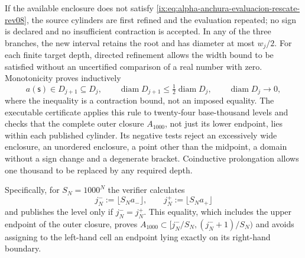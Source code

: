 If the available enclosure does not satisfy
\eqref{ix:eq:alpha-anchura-evaluacion-rescate-rev08}, the source cylinders are first
refined and the evaluation repeated; no sign is declared and no
insufficient contraction is accepted. In any of the three branches, the new
interval retains the root and has diameter at most \(w_j/2\). For each
finite target depth, directed refinement allows the width bound to be
satisfied without an uncertified comparison of a real number with zero.
Monotonicity proves inductively
\begin{equation}
 a(\mathsf s)\in D_{j+1}\subseteq D_j,\qquad
 \operatorname{diam}D_{j+1}\leq
 \tfrac12\operatorname{diam}D_j,
 \qquad \operatorname{diam}D_j\longrightarrow0,
 \label{ix:eq:alpha-biseccion-racional}
\end{equation}
where the inequality is a contraction bound, not an imposed equality.
The executable certificate applies
this rule to twenty-four base-thousand levels and checks that the complete outer
closure \(A_{1000}\), not just its lower endpoint, lies within
each published cylinder. Its negative tests reject an excessively wide
enclosure, an unordered enclosure, a point other than the midpoint, a domain without
a sign change and a degenerate bracket. Coinductive prolongation allows
one thousand to be replaced by any required depth.

Specifically, for \(S_N=1000^N\) the verifier calculates
\begin{equation}
 j_N^-:=\lfloor S_Na_-\rfloor,
 \qquad j_N^+:=\lfloor S_Na_+\rfloor
 \label{ix:eq:alpha-indices-cilindro-dirigidos-rev08}
\end{equation}
and publishes the level only if \(j_N^-=j_N^+\). This equality, which includes the
upper endpoint of the outer closure, proves
\(A_{1000}\subset[j_N^-/S_N,(j_N^-+1)/S_N)\) and avoids assigning to the left-hand
cell an endpoint lying exactly on its right-hand boundary.

